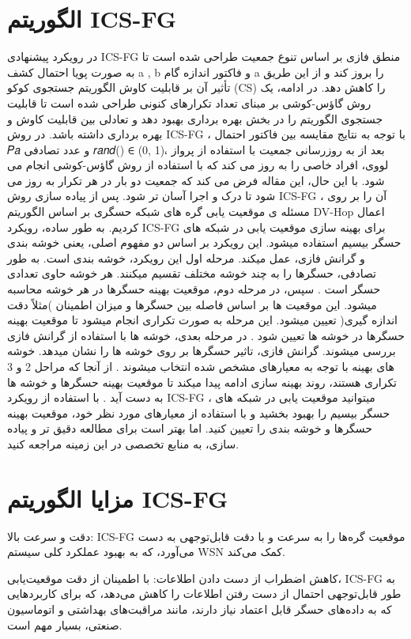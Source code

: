 \documentclass{CSICC2020}
\begin{document}
\section{الگوریتم ICS-FG}
در رویکرد پیشنهادی ICS-FG منطق فازی بر اساس تنوع جمعیت طراحی شده است تا به صورت پویا احتمال کشف a , b و فاکتور اندازه گام a را بروز کند و از این طریق تأثیر آن بر قابلیت کاوش الگوریتم جستجوی کوکو (CS) را کاهش دهد. در ادامه، یک روش گاؤس-کوشی بر مبنای تعداد تکرارهای کنونی طراحی شده است تا قابلیت جستجوی الگوریتم را در بخش بهره برداری بهبود دهد و تعادلی بین قابلیت کاوش و بهره برداری داشته باشد. در روش ICS-FG ، با توجه به نتایج مقایسه بین فاکتور احتمال 𝑃𝑎 و عدد تصادفی 𝑟𝑎𝑛𝑑() ∈ (0, 1)، بعد از به روزرسانی جمعیت با استفاده از پرواز لووی، افراد خاصی را به روز می کند که با استفاده از روش گاؤس-کوشی انجام می شود. با این حال، این مقاله فرض می کند که جمعیت دو بار در هر تکرار به روز می شود تا درک و اجرا آسان تر شود. پس از پیاده سازی روش ICS-FG ، آن را بر روی مسئله ی موقعیت یابی گره های شبکه حسگری بر اساس الگوریتم DV-Hop  اعمال کردیم. 
به طور ساده، رویکرد ICS-FG برای بهینه سازی موقعیت یابی در شبکه های حسگر بیسیم استفاده میشود. این رویکرد بر اساس دو مفهوم اصلی، یعنی خوشه بندی و گرانش فازی، عمل میکند. مرحله اول این رویکرد، خوشه بندی است. به طور تصادفی، حسگرها را به چند خوشه مختلف تقسیم میکنند. هر خوشه حاوی تعدادی حسگر است . سپس، در مرحله دوم، موقعیت بهینه حسگرها در هر خوشه محاسبه میشود. این موقعیت ها بر اساس فاصله بین حسگرها و میزان اطمینان )مثلاً دقت اندازه گیری( تعیین میشود. این مرحله به صورت تکراری انجام میشود تا موقعیت بهینه حسگرها در خوشه ها تعیین شود . 
در مرحله بعدی، خوشه ها با استفاده از گرانش فازی بررسی میشوند. گرانش فازی، تاثیر حسگرها بر روی خوشه ها را نشان میدهد. خوشه های بهینه با توجه به معیارهای مشخص شده انتخاب میشوند . از آنجا که مراحل 2 و 3 تکراری هستند، روند بهینه سازی ادامه پیدا میکند تا موقعیت بهینه حسگرها و خوشه ها به دست آید . با استفاده از رویکرد ICS-FG ، میتوانید موقعیت یابی در شبکه های حسگر بیسیم را بهبود بخشید و با استفاده از معیارهای مورد نظر خود، موقعیت بهینه حسگرها و خوشه بندی را تعیین کنید. اما بهتر است برای مطالعه دقیق تر و پیاده سازی، به منابع تخصصی در این زمینه مراجعه کنید.

\section{مزایا الگوریتم ICS-FG }

دقت و سرعت بالا: ICS-FG موقعیت گره‌ها را به سرعت و با دقت قابل‌توجهی به دست می‌آورد، که به بهبود عملکرد کلی سیستم WSN کمک می‌کند.

کاهش اضطراب از دست دادن اطلاعات: با اطمینان از دقت موقعیت‌یابی، ICS-FG به طور قابل‌توجهی احتمال از دست رفتن اطلاعات را کاهش می‌دهد، که برای کاربردهایی که به داده‌های حسگر قابل اعتماد نیاز دارند، مانند مراقبت‌های بهداشتی و اتوماسیون صنعتی، بسیار مهم است.
\end{document}
